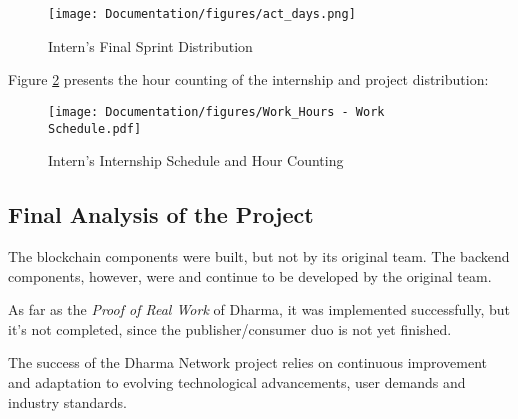  \begin{figure}[htbp]
	\centering
	\texttt{[image: Documentation/figures/act\_days.png]}  %
	\caption{Intern's Final Sprint Distribution}
	\label{act_days}
\end{figure}

Figure \ref{sch} presents the hour counting of the internship and project distribution:


\begin{figure}[htbp]
	\centering
	\texttt{[image: Documentation/figures/Work\_Hours - Work Schedule.pdf]}  %
	\caption{Intern's Internship Schedule and Hour Counting}
	\label{sch}
\end{figure}

\subsection{Final Analysis of the Project}

The blockchain components were built, but not by its original team. The backend components, however, were and continue to be developed by the original team.\newline

As far as the \textit{Proof of Real Work} of Dharma, it was implemented successfully, but it's not completed, since the publisher/consumer duo is not yet finished.\newline

The success of the Dharma Network project relies on continuous improvement and adaptation to evolving technological advancements, user demands and industry standards.